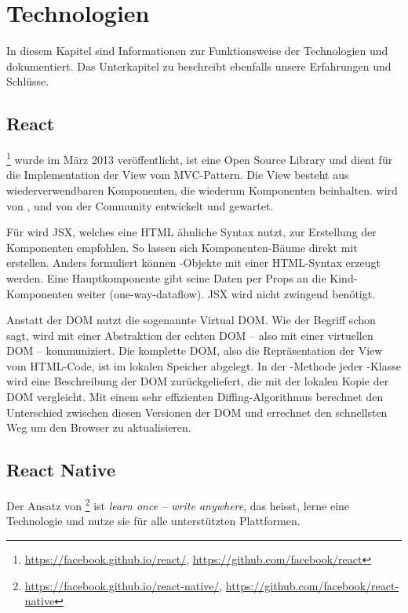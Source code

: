 \chapter{Technologien}
\label{pd-technologien}
In diesem Kapitel sind Informationen zur Funktionsweise der Technologien  und  dokumentiert. 
Das Unterkapitel zu  beschreibt ebenfalls unsere Erfahrungen und Schlüsse.


\section{React} 
\footnote{\url{https://facebook.github.io/react/}, \url{https://github.com/facebook/react}} wurde im März 2013 veröffentlicht\cite{react-release}, ist eine Open Source  \gls{Library} und dient für die Implementation der View vom \gls{MVC}-Pattern. 
Die View besteht aus wiederverwendbaren Komponenten, die wiederum Komponenten beinhalten.
 wird von ,  und von der Community entwickelt und gewartet.\cite{react}

Für  wird \gls{JSX}, welches eine HTML ähnliche Syntax nutzt, zur Erstellung der Komponenten empfohlen. 
So lassen sich Komponenten-Bäume direkt mit  erstellen. 
Anders formuliert können -Objekte mit einer HTML-Syntax erzeugt werden. 
Eine Hauptkomponente gibt seine Daten per Props an die Kind-Komponenten weiter (one-way-dataflow).\cite{react-data-flow}
\gls{JSX} wird nicht zwingend benötigt.\cite{jsx-syntax}

Anstatt der \gls{DOM} nutzt  die sogenannte \gls{Virtual DOM}.
Wie der Begriff schon sagt, wird mit einer Abstraktion der echten \gls{DOM} -- also mit einer virtuellen DOM -- kommuniziert.
Die komplette \gls{DOM}, also die Repräsentation der View vom HTML-Code, ist im lokalen Speicher abgelegt.\cite{virtual-dom}
In der -Methode jeder -Klasse wird eine Beschreibung der DOM zurückgeliefert, die  mit der lokalen Kopie der \gls{DOM} vergleicht.
Mit einem sehr effizienten Diffing-Algorithmus berechnet  den Unterschied zwischen diesen  Versionen der \gls{DOM} und errechnet den schnellsten Weg um den Browser zu aktualisieren.\cite{react-virtual-dom}


\section{React Native}
Der Ansatz von \footnote{\url{https://facebook.github.io/react-native/}, \url{https://github.com/facebook/react-native}} ist \textit{learn once -- write anywhere}, das heisst, lerne eine Technologie und nutze sie für alle unterstützten Plattformen.\cite{react-native}

